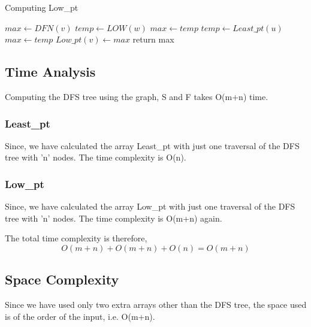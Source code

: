 \documentclass{article}
\begin{document}
\begin{algorithm}
\caption{Computing Low\_pt}
\label{lowAlgo}
\begin{algorithmic}[1]
\State $max \gets DFN(v)$
  
\State $temp \gets LOW(w)$
\State $max \gets temp $
\EndIf
\EndFor
{} 
\State $temp \gets Least\_pt(u)$
\State $max \gets temp $
\EndIf
\EndFor
\State $Low\_pt(v) \gets max$
\State return max
\EndProcedure
\end{algorithmic}
\end{algorithm}

\subsection{Time Analysis}
Computing the DFS tree using the graph, S and F takes O(m+n) time.

\subsubsection{Least\_pt}
Since, we have calculated the array Least\_pt with just one traversal of the DFS tree with 'n' nodes. The time complexity is O(n).

\subsubsection{Low\_pt}
Since, we have calculated the array Low\_pt with just one traversal of the DFS tree with 'n' nodes. The time complexity is O(m+n) again.

\par The total time complexity is therefore,
$$O(m+n) + O(m+n) + O(n) = O(m+n)$$

\subsection{Space Complexity}
Since we have used only two extra arrays other than the DFS tree, the space used is of the order of the input, i.e. O(m+n).
\end{document}
